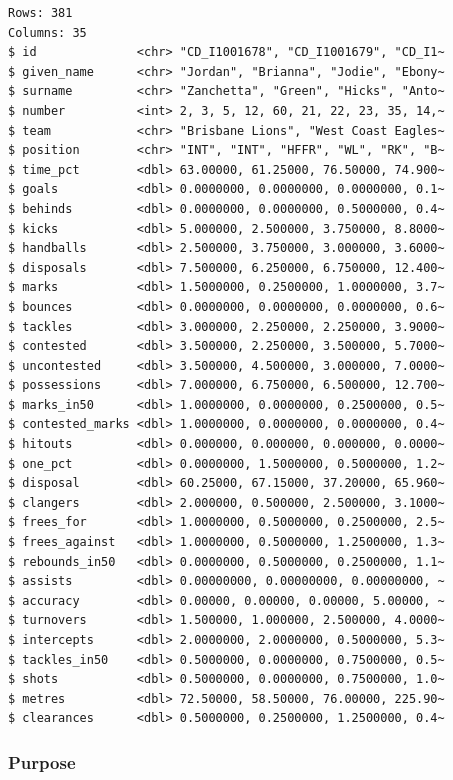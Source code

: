 \documentclass[
  letterpaper,
]{krantz}
\begin{document}
\begin{verbatim}
Rows: 381
Columns: 35
$ id              <chr> "CD_I1001678", "CD_I1001679", "CD_I1~
$ given_name      <chr> "Jordan", "Brianna", "Jodie", "Ebony~
$ surname         <chr> "Zanchetta", "Green", "Hicks", "Anto~
$ number          <int> 2, 3, 5, 12, 60, 21, 22, 23, 35, 14,~
$ team            <chr> "Brisbane Lions", "West Coast Eagles~
$ position        <chr> "INT", "INT", "HFFR", "WL", "RK", "B~
$ time_pct        <dbl> 63.00000, 61.25000, 76.50000, 74.900~
$ goals           <dbl> 0.0000000, 0.0000000, 0.0000000, 0.1~
$ behinds         <dbl> 0.0000000, 0.0000000, 0.5000000, 0.4~
$ kicks           <dbl> 5.000000, 2.500000, 3.750000, 8.8000~
$ handballs       <dbl> 2.500000, 3.750000, 3.000000, 3.6000~
$ disposals       <dbl> 7.500000, 6.250000, 6.750000, 12.400~
$ marks           <dbl> 1.5000000, 0.2500000, 1.0000000, 3.7~
$ bounces         <dbl> 0.0000000, 0.0000000, 0.0000000, 0.6~
$ tackles         <dbl> 3.000000, 2.250000, 2.250000, 3.9000~
$ contested       <dbl> 3.500000, 2.250000, 3.500000, 5.7000~
$ uncontested     <dbl> 3.500000, 4.500000, 3.000000, 7.0000~
$ possessions     <dbl> 7.000000, 6.750000, 6.500000, 12.700~
$ marks_in50      <dbl> 1.0000000, 0.0000000, 0.2500000, 0.5~
$ contested_marks <dbl> 1.0000000, 0.0000000, 0.0000000, 0.4~
$ hitouts         <dbl> 0.000000, 0.000000, 0.000000, 0.0000~
$ one_pct         <dbl> 0.0000000, 1.5000000, 0.5000000, 1.2~
$ disposal        <dbl> 60.25000, 67.15000, 37.20000, 65.960~
$ clangers        <dbl> 2.000000, 0.500000, 2.500000, 3.1000~
$ frees_for       <dbl> 1.0000000, 0.5000000, 0.2500000, 2.5~
$ frees_against   <dbl> 1.0000000, 0.5000000, 1.2500000, 1.3~
$ rebounds_in50   <dbl> 0.0000000, 0.5000000, 0.2500000, 1.1~
$ assists         <dbl> 0.00000000, 0.00000000, 0.00000000, ~
$ accuracy        <dbl> 0.00000, 0.00000, 0.00000, 5.00000, ~
$ turnovers       <dbl> 1.500000, 1.000000, 2.500000, 4.0000~
$ intercepts      <dbl> 2.0000000, 2.0000000, 0.5000000, 5.3~
$ tackles_in50    <dbl> 0.5000000, 0.0000000, 0.7500000, 0.5~
$ shots           <dbl> 0.5000000, 0.0000000, 0.7500000, 1.0~
$ metres          <dbl> 72.50000, 58.50000, 76.00000, 225.90~
$ clearances      <dbl> 0.5000000, 0.2500000, 1.2500000, 0.4~
\end{verbatim}

\subsubsection*{Purpose}\label{purpose}
\end{document}
